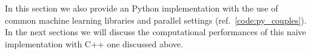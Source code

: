\documentclass{standalone}
\begin{document}
In this section we also provide an  Python implementation with the use of common machine learning libraries and parallel settings (ref.~\ref{code:py_couples}).
In the next sections we will discuss the computational performances of this naive implementation with \textsf{C++} one discussed above.
\end{document}

